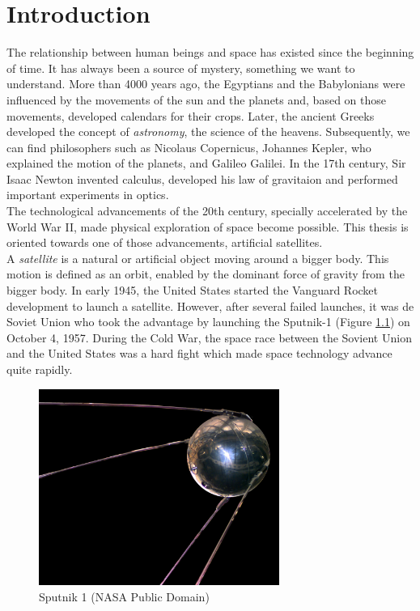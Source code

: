 \cleardoublepage
\setcounter{page}{1}

\chapter{Introduction} 
The relationship between human beings and space has existed since the beginning of time. It has always been a source of mystery, something we want to understand. More than 4000 years ago, the Egyptians and the Babylonians were influenced by the movements of the sun and the planets and, based on those movements, developed calendars for their crops. Later, the ancient Greeks developed the concept of \emph{astronomy}, the science of the heavens. Subsequently, we can find philosophers such as Nicolaus Copernicus, Johannes Kepler, who explained the motion of the planets, and Galileo Galilei. In the 17th century, Sir Isaac Newton invented calculus, developed his law of gravitaion and performed important experiments in optics.\\

The technological advancements of the 20th century, specially accelerated by the World War II, made physical exploration of space become possible. This thesis is oriented towards one of those advancements, artificial satellites.\\

A \emph{satellite} is a natural or artificial object moving around a bigger body. This motion is defined as an orbit, enabled by the dominant force of gravity from the bigger body. In early 1945, the United States started the Vanguard Rocket development to launch a satellite. However, after several failed launches, it was de Soviet Union who took the advantage by launching the Sputnik-1 (Figure \ref{f1.1}) on October 4, 1957. During the Cold War, the space race between the Sovient Union and the United States was a hard fight which made space technology advance quite rapidly.\\

\begin{figure}[H]
\centerline{\includegraphics[width=0.7\textwidth]{images/sputnik.jpg}}
\caption{Sputnik 1 (NASA Public Domain)}
\label{f1.1}
\end{figure}

